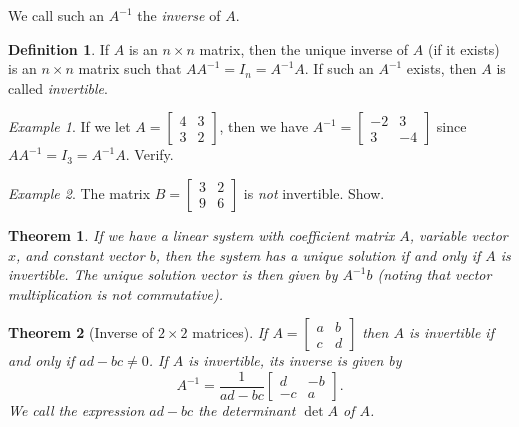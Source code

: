 \documentclass[10pt, a4paper]{amsart}
\newtheorem{thm}{Theorem}
\theoremstyle{definition}
\newtheorem{defn}{Definition}
\theoremstyle{remark}
\newtheorem{ex}{Example}
\begin{document}
We call such an $ A^{-1} $ the \emph{inverse} of $ A $.
\begin{defn}
  If $ A $ is an $ n \times n $ matrix, then the unique inverse of $ A $ (if it exists) is an
  $ n \times n $ matrix such that $ A A^{-1} = I_n = A^{-1} A $. If such an $ A^{-1} $
  exists, then $ A $ is called \emph{invertible}.
\end{defn}

\begin{ex}
 If we let $ A = \begin{bmatrix} 4 & 3 \\ 3 & 2 \end{bmatrix} $, then we have $ A^{-1} = \begin{bmatrix} -2 & 3 \\ 3 & -4 \end{bmatrix} $
 since $ A A^{-1} = I_3 = A^{-1} A $. Verify.
\end{ex}

\begin{ex}
  The matrix $ B = \begin{bmatrix} 3 & 2 \\ 9 & 6 \end{bmatrix} $ is \emph{not} invertible. Show.
\end{ex}

\begin{thm}
  If we have a linear system with coefficient matrix $ A $, variable vector $ x $, and constant vector $ b $,
  then the system has a unique solution if and only if $ A $ is invertible.  The unique solution vector is
  then given by $ A^{-1} b $ (noting that vector multiplication is not commutative).
\end{thm}

\begin{thm}[Inverse of $ 2 \times 2 $ matrices]
  If $ A = \begin{bmatrix} a & b \\ c & d \end{bmatrix} $ then $ A $ is invertible if and only if
  $ ad - bc \neq 0 $. If $ A $ is invertible, its inverse is given by
  \begin{displaymath}
    A^{-1} = \frac{1}{ad - bc}\begin{bmatrix} d & -b \\ -c & a \end{bmatrix}.
  \end{displaymath}
  We call the expression $ ad - bc $ the \emph{determinant} $ \det A $ of $ A $.
\end{thm}
\end{document}
